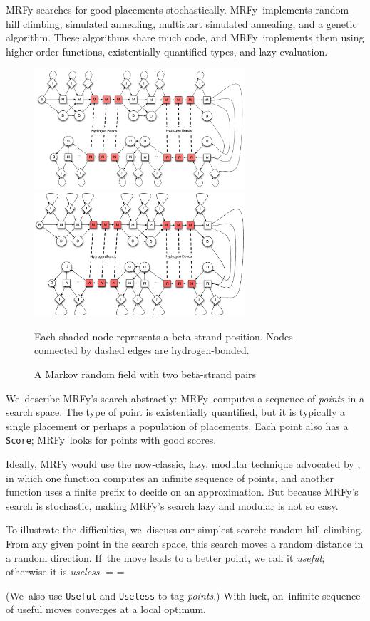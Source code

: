 \documentclass[preprint,nonatbib,blockstyle,times]{sigplanconf}
\newcommand\mrfy{MRFy} %
\newif\ifverbatimsmall
\newcommand\smallverbatiminput[1]{%
  \verbatimsmalltrue
  \presvtopsep=\topsep
  \topsep=0.78\topsep
  \verbatimsmallfalse
  \topsep=\presvtopsep
}
\begin{document}
MRFy searches for good placements stochastically.
\mrfy\ implements
random hill
climbing, simulated  
annealing, multistart simulated annealing, and a genetic algorithm.
These algorithms share much code, and \mrfy\ implements them using
higher-order functions, 
existentially 
quantified types, and lazy evaluation.


\begin{figure}
\ifpdfmadness
\centerline{\includegraphics[width=7.8cm]{mrf_interleave_diagram.pdf}} 
\else
\centerline{\includegraphics[width=7.8cm]{mrf_interleave_diagram.eps}} 
\fi
Each shaded node represents a beta-strand position.
Nodes connected by dashed edges are hydrogen-bonded.

\caption{A Markov random field with two beta-strand pairs}
\label{mrf} 
\end{figure}



We~describe \mrfy's search abstractly: \mrfy\ computes a sequence
of \emph{points} in a search space.
The type of point is existentially quantified, but it is typically
a single placement or perhaps a population of placements. 
Each point also has a \texttt{Score}; \mrfy\ looks for points with
good scores.

Ideally, MRFy would use the now-classic, lazy, modular
technique advocated by \citet{hughes:why}, in which one function
computes an infinite sequence of points, and another function
uses a finite prefix to decide on an approximation.
But because MRFy's search is stochastic, 
making MRFy's search lazy and modular is not so easy.

To illustrate the difficulties, we~discuss our simplest search:
random hill climbing.
From any given point in the search space, this search moves a random
distance in a random 
direction.
If~the move leads to a better point, 
we call it \emph{useful};
otherwise it is \emph{useless}.
\smallverbatiminput{utility}
(We~also use \texttt{Useful} and \texttt{Useless} to tag \emph{points}.)
With luck, an~infinite sequence of useful moves converges
at a local optimum.
\end{document}
